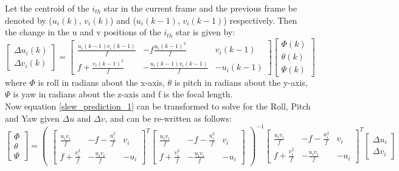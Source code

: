 \documentclass[../../main.tex]{subfiles}
\begin{document}
\begin{itemize}
    Let the centroid of the $i_{th}$ star in the current frame and the previous frame be denoted by ($u_{i}(k)$, $v_{i}(k)$) and ($u_{i}(k-1)$, $v_{i}(k-1)$) respectively. Then the change in the u and v positions of the $i_{th}$ star is given by:
     \begin{equation} \label{slew_prediction_1}
        \begin{bmatrix}
         \Delta u_{i}(k) \\ \Delta v_{i}(k)
        \end{bmatrix} = 
        \begin{bmatrix}
        \frac{u_{i}(k-1)v_{i}(k-1)}{f} & -f \frac{u_{i}(k-1)^2}{f} & v_{i}(k-1) \\
        f + \frac{v_{i}(k-1)^2}{f} & -\frac{u_{i}(k-1)v_{i}(k-1)}{f} & -u_{i}(k-1)
        \end{bmatrix}
        \begin{bmatrix}
         \Phi(k) \\ \theta(k) \\ \Psi(k)
        \end{bmatrix}
     \end{equation}
     where \textbf{$\Phi$} is roll in radians about the x-axis, \textbf{$\theta$} is pitch in radians about the y-axis, \textbf{$\Psi$} is yaw in radians about the z-axis and f is the focal length.  \\ 
     Now equation \ref{slew_prediction_1} can be transformed to solve for the Roll, Pitch and Yaw given $\Delta u$ and $\Delta v$, and can be re-written as follows: 
     \footnotesize
     \begin{equation} \label{slew_prediction_2}
         \begin{bmatrix}
         \Phi \\ \theta \\ \Psi
        \end{bmatrix} = 
        \begin{pmatrix}
        \begin{bmatrix}
        \frac{u_{i}v_{i}}{f} & -f-\frac{u_{i}^2}{f} & v_{i} \\
        f+\frac{v_{i}^2}{f} & -\frac{u_{i}v_{i}}{f} & -u_{i}
        \end{bmatrix}^T
        \begin{bmatrix}
        \frac{u_{i}v_{i}}{f} & -f-\frac{u_{i}^2}{f} & v_{i} \\
        f+\frac{v_{i}^2}{f} & -\frac{u_{i}v_{i}}{f} & -u_{i}
        \end{bmatrix}
        \end{pmatrix}^{-1}
        \begin{bmatrix}
        \frac{u_{i}v_{i}}{f} & -f-\frac{u_{i}^2}{f} & v_{i} \\
        f+\frac{v_{i}^2}{f} & -\frac{u_{i}v_{i}}{f} & -u_{i}
        \end{bmatrix}^T
        \begin{bmatrix}
        \Delta u_{i} \\ \Delta v_{i}
        \end{bmatrix}
     \end{equation}
     

\end{itemize}
\end{document}
